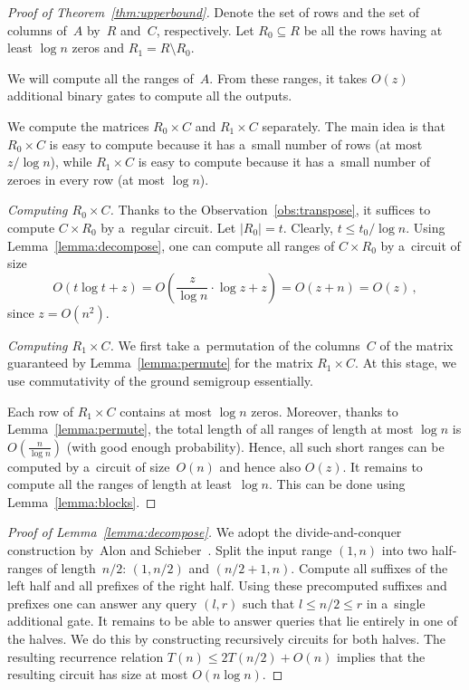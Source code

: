 \documentclass[11pt,letterpaper]{article}
\begin{document}
\begin{proof}[Proof of Theorem~\ref{thm:upperbound}]

Denote the set of rows and the set of columns of~$A$ by~$R$
and~$C$, respectively. Let $R_0 \subseteq R$ be all the rows
having at least $\log n$ zeros and $R_1=R \setminus R_0$.

We will compute all the ranges of~$A$. From these ranges,
it takes $O(z)$ additional binary gates to compute all the outputs.

We
compute the matrices $R_0 \times C$ and $R_1 \times C$
separately. The main idea is that $R_0 \times C$ is easy to compute
because it has a~small number of rows (at most $z/\log n$), while $R_1 \times C$
is easy to compute because it has a~small number of zeroes in every row (at most
$\log n$).

\emph{Computing $R_0 \times C$.} Thanks to the Observation~\ref{obs:transpose},
it suffices to compute $C \times R_0$ by a~regular circuit.
Let $|R_0|=t$. Clearly, $t \le t_0/\log n$.
Using Lemma~\ref{lemma:decompose}, one can compute all
ranges of $C \times R_0$ by a~circuit of size
\[O(t\log t+z)=O\left(\frac{z}{\log n} \cdot \log z+z\right)=O(z+n)=O(z)\, ,\]
since $z =O(n^2)$.

\emph{Computing $R_1 \times C$.} We first take a~permutation 
of the columns~$C$ of the matrix
guaranteed by Lemma~\ref{lemma:permute} for 
the matrix $R_1 \times C$. At this stage, we use 
commutativity of the ground semigroup essentially.

Each row of
$R_1 \times C$ contains at most $\log n$ zeros. Moreover,
thanks to Lemma~\ref{lemma:permute}, the total length of all
ranges of length at most $\log n$ is $O(\frac{n}{\log n})$ 
(with good enough probability).
Hence, all such short ranges can be computed by a~circuit of
size~$O(n)$ and hence also $O(z)$. 
It remains to compute all the ranges of
length at least~$\log n$. This can be done using Lemma~\ref{lemma:blocks}.
\end{proof}

\begin{proof}[Proof of Lemma~\ref{lemma:decompose}]
We adopt the divide-and-conquer construction by~Alon and Schieber~\cite{Alon87optimalpreprocessing}.
Split the input range $(1,n)$ into two half-ranges of
length~$n/2$:
$(1,n/2)$ and $(n/2+1,n)$.
Compute all suffixes of the left half and all prefixes of
the right half.
Using these precomputed suffixes and
prefixes one can answer any query $(l,r)$ such that $l \le n/2
\le r$ in a~single additional gate. It remains to be able to answer
queries that lie entirely in one of the halves. We do this by
constructing recursively circuits for both halves. The resulting
recurrence relation $T(n) \le 2T(n/2)+O(n)$ implies that the
resulting circuit has size at most $O(n\log n)$.
\end{proof}
\end{document}
